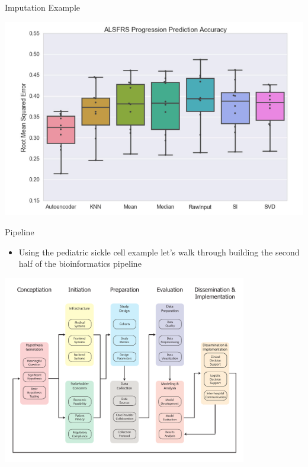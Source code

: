 \documentclass[10pt, xcolor=table]{beamer}
\begin{document}
\begin{frame}{Imputation Example}
	\begin{center}
		\includegraphics[width=1\textwidth]{images/paper_alsfrs.pdf}	
	\end{center}
\end{frame}


\begin{frame}{Pipeline}
	\begin{itemize}
		\item Using the pediatric sickle cell example let's walk through building the second half of the bioinformatics pipeline
	\end{itemize}
	\begin{center}
		\includegraphics[width=0.8\textwidth]{images/informatics_pipeline.pdf}	
	\end{center}
\end{frame}
\end{document}
